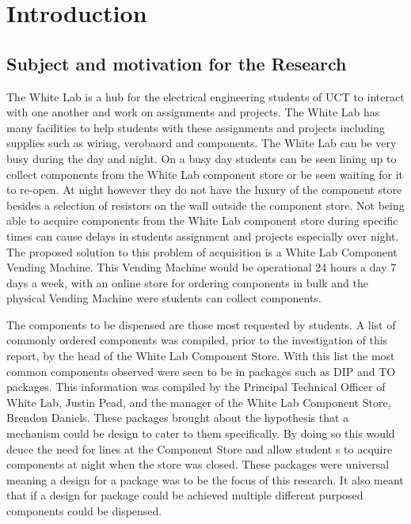 \documentclass[a4paper,11pt]{article}
\numberwithin{figure}{section}
\numberwithin{table}{section}
\begin{document}
\section{Introduction}
	\subsection{Subject and motivation for the Research}
The White Lab is a hub for the electrical engineering students of UCT to interact with one another and work on assignments and projects. The White Lab has many facilities to help students with these assignments and projects including supplies such as wiring, verobaord and components. The White Lab can be very busy during the day and night. On a busy day students can be seen lining up to collect components from the White Lab component store or be seen waiting for it to re-open. At night however they do not have the luxury of the component store besides a selection of resistors on the wall outside the component store. Not being able to acquire components from the White Lab component store during specific times can cause delays in students assignment and projects especially over night. The proposed solution to this problem of acquisition is a White Lab Component Vending Machine. This Vending Machine would be operational 24 hours a day 7 days a week, with an online store for ordering components in bulk and the physical Vending Machine were students can collect components. 

The components to be dispensed are those most requested by students. A list of commonly ordered components was compiled, prior to the investigation of this report, by the head of the White Lab Component Store. With this list the most common components observed were seen to be in packages such as DIP and TO packages. This information was compiled by the Principal Technical Officer of White Lab, Justin Pead, and the manager of the White Lab Component Store, Brendon Daniels. These packages brought about the hypothesis that a mechanism could be design to cater to them specifically. By doing so this would deuce the need for lines at the Component Store and allow student s to acquire components at night when the store was closed. These packages were universal meaning a design for a package was to be the focus of this research. It also meant that if a design for package could be achieved multiple different purposed components could be dispensed.
\end{document}
